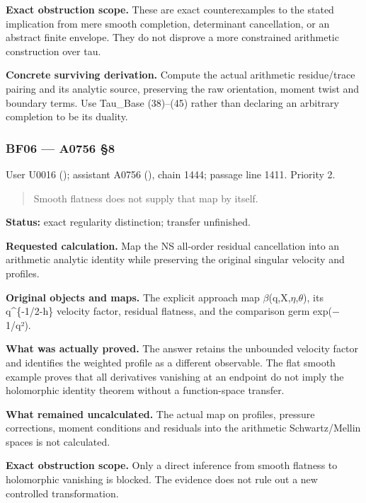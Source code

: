 \textbf{Exact obstruction scope.} These are exact counterexamples to the
stated implication from mere smooth completion, determinant
cancellation, or an abstract finite envelope. They do not disprove a
more constrained arithmetic construction over tau.

\textbf{Concrete surviving derivation.} Compute the actual arithmetic
residue/trace pairing and its analytic source, preserving the raw
orientation, moment twist and boundary terms. Use Tau\_Base (38)--(45)
rather than declaring an arbitrary completion to be its duality.

\subsubsection{BF06 --- A0756 §8}\label{TranscriptLedgerStage:bf06-a0756-8}

User U0016 (\protect{});
assistant A0756 (\protect{}),
chain 1444; passage line 1411. Priority 2.

\begin{quote}
Smooth flatness does not supply that map by itself.
\end{quote}

\textbf{Status:} exact regularity distinction; transfer unfinished.

\textbf{Requested calculation.} Map the NS all-order residual
cancellation into an arithmetic analytic identity while preserving the
original singular velocity and profiles.

\textbf{Original objects and maps.} The explicit approach map
\allowbreak{}\ensuremath{β}\allowbreak{}(q,X,\allowbreak{}\ensuremath{η}\allowbreak{},\allowbreak{}\ensuremath{θ}\allowbreak{}),
its q\^{}\{-1/2-h\} velocity factor, residual flatness, and the
comparison germ exp(\allowbreak{}\ensuremath{−}\allowbreak{}1/q²).

\textbf{What was actually proved.} The answer retains the unbounded
velocity factor and identifies the weighted profile as a different
observable. The flat smooth example proves that all derivatives
vanishing at an endpoint do not imply the holomorphic identity theorem
without a function-space transfer.

\textbf{What remained uncalculated.} The actual map on profiles,
pressure corrections, moment conditions and residuals into the
arithmetic Schwartz/Mellin spaces is not calculated.

\textbf{Exact obstruction scope.} Only a direct inference from smooth
flatness to holomorphic vanishing is blocked. The evidence does not rule
out a new controlled transformation.

